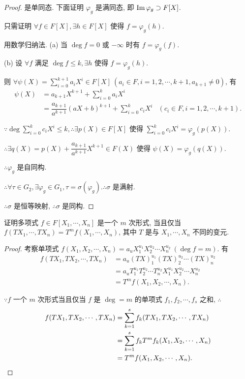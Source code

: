 \documentclass[UTF8]{ctexart}
\begin{document}
\begin{proof}
    是单同态. 下面证明 $\varphi_g$ 是满同态, 即 $\operatorname{Im} \varphi_g\supset F[X]$.

    只需证明 $\forall f\in F[X],\exists h\in F[X]$ 使得 $f=\varphi_g(h)$.

    用数学归纳法. (a) 当 $\deg f=0$ 或 $-\infty$ 时有 $f=\varphi_g(f)$.

    (b) 设 $\forall f$ 满足 $\deg f\leq k,\exists h$ 使得 $f=\varphi_g(h)$.

    则 $\forall\psi(X)=\sum\limits_{i=0}^{k+1}a_iX^i\in F[X]\ (a_i\in F,i=1,2,\cdots,k+1,a_{k+1}\neq0)$, 有
    \begin{align*}
        \psi(X) & =a_{k+1}X^{k+1}+\sum\limits_{i=0}^{k}a_iX^i \\
        & =\dfrac{a_{k+1}}{a^{k+1}}(aX+b)^{k+1}+\sum\limits_{i=0}^{k}c_iX^i & (c_i\in F,i=1,2,\cdots,k+1).
    \end{align*}

    $\because\deg\sum\limits_{i=0}^{k}c_iX^i\leq k,\therefore\exists p(X)\in F[X]$ 使得 $\sum\limits_{i=0}^{k}c_iX^i=\varphi_g(p(X))$.

    $\therefore\exists q(X)=p(X)+\dfrac{a_{k+1}}{a^{k+1}}X^{k+1}\in F(X)$ 使得 $\psi(X)=\varphi_g(q(X))$.

    $\therefore\varphi_g$ 是自同构.

    $\therefore\forall\tau\in G_2,\exists\varphi_g\in G_1,\tau=\sigma(\varphi_g).\therefore\sigma$ 是满射.

    $\therefore\sigma$ 是恒等映射, $\therefore\sigma$ 是同构.
\end{proof}
\begin{exercise}%
    证明多项式 $f\in F[X_1,\cdots,X_n]$ 是一个 $m$ 次形式, 当且仅当 $f(TX_1,\cdots,TX_n)=T^mf(X_1,\cdots,X_n)$, 其中 $T$ 是与 $X_1,\cdots,X_n$ 不同的变元.
\end{exercise}
\begin{proof}
    考察单项式 $f(X_1,X_2,\cdots,X_n)=a_uX^{u_1}_1X^{u_2}_2\cdots X^{u_2}_n\ (\deg f=m)$. 有
    \begin{align*}
        f(TX_1,TX_2,\cdots,TX_n) & =a_u(TX)^{u_1}_1(TX)^{u_2}_2\cdots (TX)^{u_2}_n \\
        & =a_uT^{u_1}_1T^{u_2}_2\cdots T^{u_2}_nX^{u_1}_1X^{u_2}_2\cdots X^{u_2}_n \\
        & =T^mf(X_1,X_2,\cdots,X_n).
    \end{align*}

    $\because f$ 一个 $m$ 次形式当且仅当 $f$ 是 $\deg=m$ 的单项式 $f_1,f_2,\cdots,f_s$ 之和, $\therefore$
    \begin{align*}
        f(TX_1,TX_2,\cdots,TX_n) & =\sum\limits_{k=1}^sf_k(TX_1,TX_2,\cdots,TX_n) \\
        & =\sum\limits_{k=1}^sf_kT^mf_k(X_1,X_2,\cdots,X_n) \\
        & =T^mf(X_1,X_2,\cdots,X_n).\qedhere
    \end{align*}
\end{proof}
\end{document}
